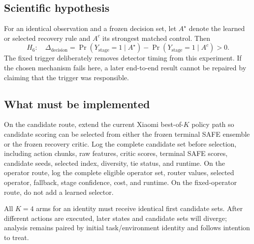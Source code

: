 

\subsection{Scientific hypothesis}

For an identical observation and a frozen decision set, let $A^\star$ denote the learned or selected recovery rule and $A^c$ its strongest matched control. Then
\begin{equation}
  H_6:\quad
  \Delta_{\mathrm{decision}}
  = \Pr(Y_{\mathrm{stage}}=1\mid A^\star)
  -\Pr(Y_{\mathrm{stage}}=1\mid A^c)>0.
\end{equation}
The fixed trigger deliberately removes detector timing from this experiment. If the chosen mechanism fails here, a later end-to-end result cannot be repaired by claiming that the trigger was responsible.

\subsection{What must be implemented}

On the candidate route, extend the current Xiaomi best-of-$K$ policy path so candidate scoring can be selected from either the frozen terminal SAFE ensemble or the frozen recovery critic. Log the complete candidate set before selection, including action chunks, raw features, critic scores, terminal SAFE scores, candidate seeds, selected index, diversity, tie status, and runtime. On the operator route, log the complete eligible operator set, router values, selected operator, fallback, stage confidence, cost, and runtime. On the fixed-operator route, do not add a learned selector.

All $K=4$ arms for an identity must receive identical first candidate sets. After different actions are executed, later states and candidate sets will diverge; analysis remains paired by initial task/environment identity and follows intention to treat.


